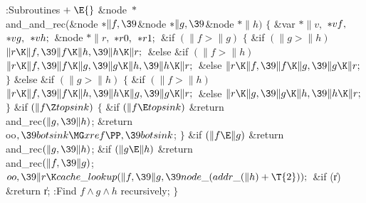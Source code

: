 \Y\B\4:Subroutines\X${}\mathrel+\E{}$\6
\&{node} ${}{*}{}$\\{and\_and\_rec}(\&{node} ${}{*}\|f,\39{}$\&{node} ${}{*}%
\|g,\39{}$\&{node} ${}{*}\|h){}$\1\1\2\2\6
${}\{{}$\1\6
\&{var} ${}{*}\|v,{}$ ${}{*}\\{vf},{}$ ${}{*}\\{vg},{}$ ${}{*}\\{vh};{}$\6
\&{node} ${}{*}\|r,{}$ ${}{*}\\{r0},{}$ ${}{*}\\{r1};{}$\7
\&{if} ${}(\|f>\|g){}$\5
${}\{{}$\1\6
\&{if} ${}(\|g>\|h){}$\1\5
${}\|r\K\|f,\39\|f\K\|h,\39\|h\K\|r;{}$\2\6
\&{else} \&{if} ${}(\|f>\|h){}$\1\5
${}\|r\K\|f,\39\|f\K\|g,\39\|g\K\|h,\39\|h\K\|r;{}$\2\6
\&{else}\1\5
${}\|r\K\|f,\39\|f\K\|g,\39\|g\K\|r;{}$\2\6
\4${}\}{}$\5
\2\&{else} \&{if} ${}(\|g>\|h){}$\5
${}\{{}$\1\6
\&{if} ${}(\|f>\|h){}$\1\5
${}\|r\K\|f,\39\|f\K\|h,\39\|h\K\|g,\39\|g\K\|r;{}$\2\6
\&{else}\1\5
${}\|r\K\|g,\39\|g\K\|h,\39\|h\K\|r;{}$\2\6
\4${}\}{}$\2\6
\&{if} ${}(\|f\Z\\{topsink}){}$\5
${}\{{}$\1\6
\&{if} ${}(\|f\E\\{topsink}){}$\1\5
\&{return} \\{and\_rec}${}(\|g,\39\|h){}$;\2\6
\&{return} \\{oo}${},\39\\{botsink}\MG\\{xref}\PP,\39\\{botsink}{}$;\6
\4${}\}{}$\2\6
\&{if} ${}(\|f\E\|g){}$\1\5
\&{return} \\{and\_rec}${}(\|g,\39\|h){}$;\2\6
\&{if} ${}(\|g\E\|h){}$\1\5
\&{return} \\{and\_rec}${}(\|f,\39\|g){}$;\2\6
${}\\{oo},\39\|r\K\\{cache\_lookup}(\|f,\39\|g,\39\\{node\_}(\\{addr\_}(\|h)+%
\T{2}));{}$\6
\&{if} (\|r)\1\5
\&{return} \|r;\2\6
:Find $f\land g\land h$ recursively\X;\6
\4${}\}{}$\2\par
\fi

